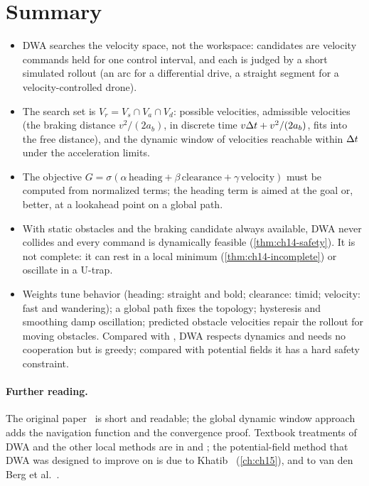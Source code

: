 \section{Summary}
\begin{summary}
\begin{itemize}
  \item DWA searches the velocity space, not the workspace: candidates are
        velocity commands held for one control interval, and each is judged
        by a short simulated rollout (an arc for a differential drive, a
        straight segment for a velocity-controlled drone).
  \item The search set is $V_r = V_s \cap V_a \cap V_d$: possible velocities,
        admissible velocities (the braking distance $v^2/(2a_b)$, in discrete
        time $v\Delta t + v^2/(2a_b)$, fits into the free distance), and the
        dynamic window of velocities reachable within $\Delta t$ under the
        acceleration limits.
  \item The objective $G = \sigma(\alpha\,\mathrm{heading} +
        \beta\,\mathrm{clearance} + \gamma\,\mathrm{velocity})$ must be
        computed from normalized terms; the heading term is aimed at the goal
        or, better, at a lookahead point on a global path.
  \item With static obstacles and the braking candidate always available,
        DWA never collides and every command is dynamically feasible
        (\cref{thm:ch14-safety}). It is not complete: it can rest in a local
        minimum (\cref{thm:ch14-incomplete}) or oscillate in a U-trap.
  \item Weights tune behavior (heading: straight and bold; clearance: timid;
        velocity: fast and wandering); a global path fixes the topology;
        hysteresis and smoothing damp oscillation; predicted obstacle
        velocities repair the rollout for moving obstacles. Compared with
        \orca, DWA respects dynamics and needs no cooperation but is greedy;
        compared with potential fields it has a hard safety constraint.
\end{itemize}
\end{summary}

\paragraph{Further reading.}
The original paper~\cite{fox1997dwa} is short and readable; the global
dynamic window approach~\cite{brock1999global} adds the navigation function
and \cite{ogren2005convergent} the convergence proof. Textbook treatments of
DWA and the other local methods are in \cite{choset2005principles} and
\cite{siciliano2016handbook}; the potential-field method that DWA was
designed to improve on is due to Khatib~\cite{khatib1986realtime}
(\cref{ch:ch15}), and \orca to van den Berg et al.~\cite{vandenberg2011orca}.

